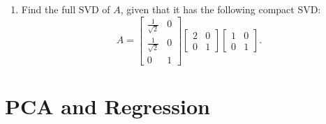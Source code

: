 \documentclass[10pt]{article}
\begin{document}
\begin{enumerate}[label=(\alph*)]
\vspace{6cm}

\item Find the full SVD of $A$, given that it has the following compact SVD:
\[
A = \begin{bmatrix} \frac{1}{\sqrt{2}} & 0 \\[4pt] \frac{1}{\sqrt{2}} & 0 \\[4pt] 0 & 1 \end{bmatrix} \begin{bmatrix} 2 & 0 \\ 0 & 1 \end{bmatrix} \begin{bmatrix} 1 & 0 \\ 0 & 1 \end{bmatrix}.
\]

\vspace{6cm}

\end{enumerate}

\section{PCA and Regression}
\end{document}
